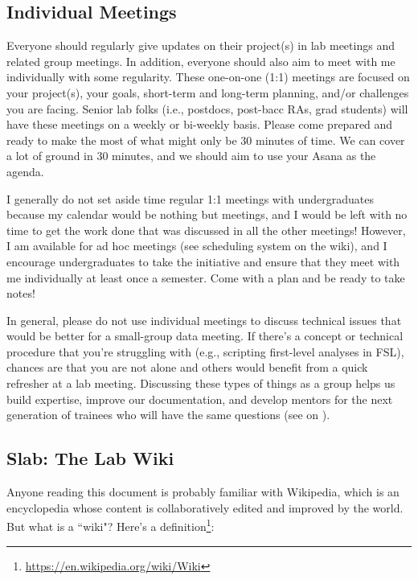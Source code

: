 \documentclass[letterpaper,11pt,oneside]{memoir}
\begin{document}
\subsection{Individual Meetings}
Everyone should regularly give updates on their project(s) in lab meetings and related group meetings. In addition, everyone should also aim to meet with me individually with some regularity. These one-on-one (1:1) meetings are focused on your project(s), your goals, short-term and long-term planning, and/or challenges you are facing. Senior lab folks (i.e., postdocs, post-bacc RAs, grad students) will have these meetings on a weekly or bi-weekly basis. Please come prepared and ready to make the most of what might only be 30 minutes of time. We can cover a lot of ground in 30 minutes, and we should aim to use your Asana as the agenda.  

I generally do not set aside time regular 1:1 meetings with undergraduates because my calendar would be nothing but meetings, and I would be left with no time to get the work done that was discussed in all the other meetings! However, I am available for ad hoc meetings (see scheduling system on the wiki), and I encourage undergraduates to take the initiative and ensure that they meet with me individually at least once a semester. Come with a plan and be ready to take notes!

In general, please do not use individual meetings to discuss technical issues that would be better for a small-group data meeting. If there's a concept or technical procedure that you're struggling with (e.g., scripting first-level analyses in FSL), chances are that you are not alone and others would benefit from a quick refresher at a lab meeting. Discussing these types of things as a group helps us build expertise, improve our documentation, and develop mentors for the next generation of trainees who will have the same questions (see  on ). 

\subsection{Slab: The Lab Wiki}
\label{sec:wiki}

Anyone reading this document is probably familiar with Wikipedia, which is an encyclopedia whose content is collaboratively edited and improved by the world. But what is a ``wiki"? Here's a definition\footnote{\url{https://en.wikipedia.org/wiki/Wiki}}:
\end{document}
